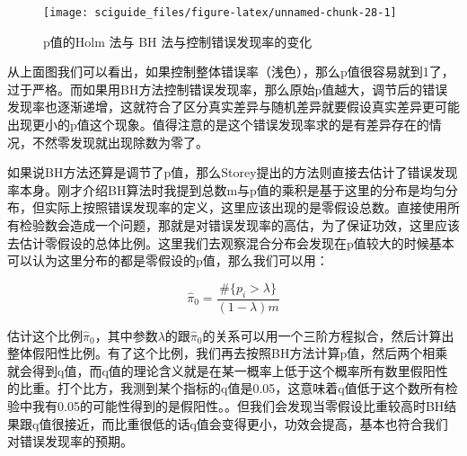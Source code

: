\documentclass[]{tufte-book}
\newenvironment{Shaded}{}{}
\newcommand{\AttributeTok}[1]{\textcolor[rgb]{0.49,0.56,0.16}{#1}}
\newcommand{\CommentTok}[1]{\textcolor[rgb]{0.38,0.63,0.69}{\textit{#1}}}
\newcommand{\FunctionTok}[1]{\textcolor[rgb]{0.02,0.16,0.49}{#1}}
\newcommand{\NormalTok}[1]{#1}
\newcommand{\OtherTok}[1]{\textcolor[rgb]{0.00,0.44,0.13}{#1}}
\newcommand{\SpecialCharTok}[1]{\textcolor[rgb]{0.25,0.44,0.63}{#1}}
\newcommand{\StringTok}[1]{\textcolor[rgb]{0.25,0.44,0.63}{#1}}
\begin{document}
\begin{figure}
\texttt{[image: sciguide\_files/figure-latex/unnamed-chunk-28-1]} \caption[p值的Holm 法与 BH 法与控制错误发现率的变化]{p值的Holm 法与 BH 法与控制错误发现率的变化}\label{fig:unnamed-chunk-28}
\end{figure}

从上面图我们可以看出，如果控制整体错误率（浅色），那么p值很容易就到1了，过于严格。而如果用BH方法控制错误发现率，那么原始p值越大，调节后的错误发现率也逐渐递增，这就符合了区分真实差异与随机差异就要假设真实差异更可能出现更小的p值这个现象。值得注意的是这个错误发现率求的是有差异存在的情况，不然零发现就出现除数为零了。

如果说BH方法还算是调节了p值，那么Storey提出的方法则直接去估计了错误发现率本身。刚才介绍BH算法时我提到总数m与p值的乘积是基于这里的分布是均匀分布，但实际上按照错误发现率的定义，这里应该出现的是零假设总数。直接使用所有检验数会造成一个问题，那就是对错误发现率的高估，为了保证功效，这里应该去估计零假设的总体比例。这里我们去观察混合分布会发现在p值较大的时候基本可以认为这里分布的都是零假设的p值，那么我们可以用：

\[
\hat\pi_0 = \frac{\#\{p_i>\lambda\}}{(1-\lambda)m}
\]

估计这个比例\(\hat\pi_0\)，其中参数\(\lambda\)的跟\(\hat\pi_0\)的关系可以用一个三阶方程拟合，然后计算出整体假阳性比例。有了这个比例，我们再去按照BH方法计算p值，然后两个相乘就会得到q值，而q值的理论含义就是在某一概率上低于这个概率所有数里假阳性的比重。打个比方，我测到某个指标的q值是0.05，这意味着q值低于这个数所有检验中我有0.05的可能性得到的是假阳性。。但我们会发现当零假设比重较高时BH结果跟q值很接近，而比重很低的话q值会变得更小，功效会提高，基本也符合我们对错误发现率的预期。

\begin{Shaded}
\end{Shaded}
\end{document}
